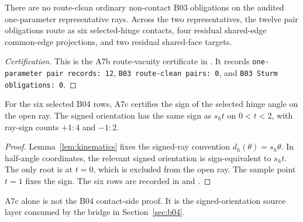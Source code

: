 \begin{certprop}
There are no route-clean ordinary non-contact B03 obligations on the audited
one-parameter representative rays.  Across the two representatives, the twelve
pair obligations route as six selected-hinge contacts, four residual shared-edge
common-edge projections, and two residual shared-face targets.
\end{certprop}

\begin{proof}[Certification]
This is the A7b route-vacuity certificate in
.  It
records \texttt{one-parameter pair records: 12}, \texttt{B03 route-clean pairs:
0}, and \texttt{B03 Sturm obligations: 0}.
\end{proof}

\begin{certprop}
For the six selected B04 rows, A7c certifies the sign of the selected hinge
angle on the open ray.  The signed orientation has the same sign as \(s_h t\)
on \(0<t<2\), with ray-sign counts \(+1:4\) and \(-1:2\).
\end{certprop}

\begin{proof}
Lemma~\ref{lem:kinematics} fixes the signed-ray convention
\(d_h(\theta)=s_h\theta\).  In half-angle coordinates, the relevant signed
orientation is sign-equivalent to \(s_h t\).  The only root is at \(t=0\),
which is excluded from the open ray.  The sample point \(t=1\) fixes the sign.
The six rows are recorded in
 and
.
\end{proof}

A7c alone is not the B04 contact-side proof.  It is the signed-orientation
source layer consumed by the bridge in Section~\ref{sec:b04}.
